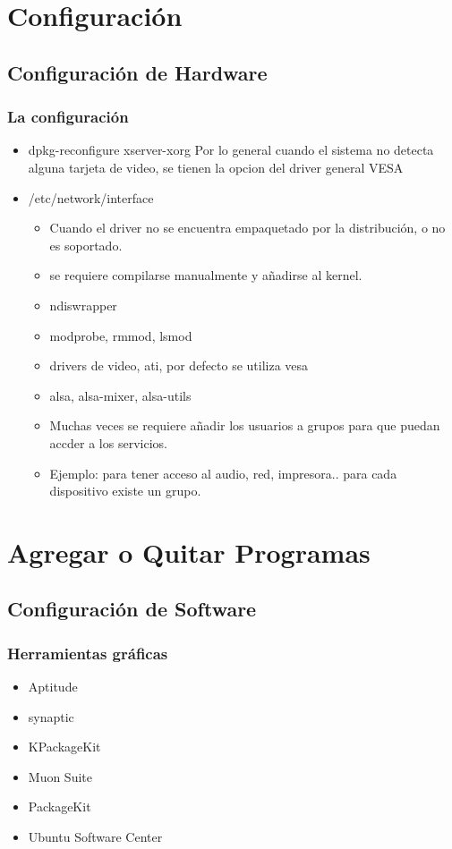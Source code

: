 \documentclass{beamer}
\begin{document}
\section{Configuraci\'on}
\subsection{Configuraci\'on de Hardware}
\begin{frame}
\frametitle{La configuraci\'on}
\begin{itemize}
\item \alert{dpkg-reconfigure xserver-xorg} Por lo general cuando el sistema no detecta alguna tarjeta de video, se tienen la opcion del driver general VESA
\item \alert{/etc/network/interface}
\begin{itemize}
	\item Cuando el driver no se encuentra empaquetado por la distribución, o no es soportado.
	\item se requiere compilarse manualmente y añadirse al kernel.
	\item \alert{ndiswrapper}
	\item \alert{modprobe, rmmod, lsmod}
	\item \alert{drivers de video, ati, por defecto se utiliza vesa}
	\item \alert{alsa, alsa-mixer, alsa-utils}
	\item Muchas veces se requiere a\~nadir los usuarios a grupos para que puedan accder a los servicios.
	\item Ejemplo: para tener acceso al audio, red, impresora.. para cada dispositivo existe un grupo.
\end{itemize}
\end{itemize}
\end{frame}

\section{Agregar o Quitar Programas}
\subsection{Configuraci\'on de Software}
\begin{frame}
\frametitle{Herramientas  gr\'aficas}
\begin{itemize}
\item Aptitude
\item synaptic
\item KPackageKit
\item Muon Suite
\item PackageKit
\item Ubuntu Software Center
\end{itemize}
\end{frame} 
\end{document}
